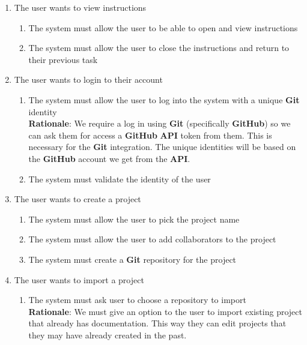 \documentclass[12pt, titlepage]{article}
\begin{document}
	\begin{enumerate}[{BE}1.]
		\item The user wants to view instructions
		\begin{enumerate}[{FR}1.]
			\item The system must allow the user to be able to open and view instructions
			\item The system must allow the user to close the instructions and return to their previous task
		\end{enumerate}
		\item The user wants to login to their account
		\begin{enumerate}[resume*]
			\item The system must allow the user to log into the system with a unique \textbf{Git} identity \\
			\textbf{Rationale}: We require a log in using \textbf{Git} (specifically \textbf{GitHub}) so we can ask them for access a \textbf{GitHub} \textbf{API} token from them. This is necessary for the \textbf{Git} integration. The unique identities will be based on the \textbf{GitHub} account we get from the \textbf{API}.
			
			\item The system must validate the identity of the user
		\end{enumerate}
		\item The user wants to create a project 
		\begin{enumerate}[resume*]
			\item The system must allow the user to pick the project name
			\item The system must allow the user to add collaborators to the project
			\item The system must create a \textbf{Git} repository for the project
		\end{enumerate}
		\item The user wants to import a project
		\begin{enumerate}[resume*]
			\item The system must ask user to choose a repository to import \\ 
			\textbf{Rationale}: We must give an option to the user to import existing project that already has documentation. This way they can edit projects that they may have already created in the past.
			

\end{enumerate}
\end{enumerate}
\end{document}
